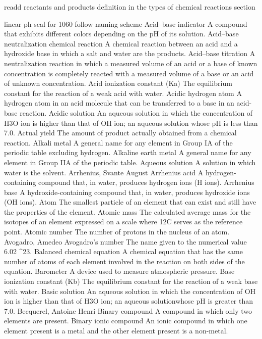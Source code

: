 \documentclass[10pt, roman]{article}
\begin{document}
readd reactants and products definition in the types of chemical reactions section


linear ph scal for 1060 
follow naming scheme
Acid–base indicator A compound that exhibits different colors depending on the pH of its solution.
Acid–base neutralization chemical reaction A chemical reaction between an acid and a hydroxide base in which a salt and water are the products.
Acid–base titration A neutralization reaction in which a measured volume of an acid or a base of known concentration is completely reacted with a measured volume of a base or an acid of unknown concentration.
Acid ionization constant (Ka) The equilibrium constant for the reaction of a weak acid with water.
Acidic hydrogen atom A hydrogen atom in an acid molecule that can be transferred to a base in an acid-base reaction.
Acidic solution An aqueous solution in which the concentration of H3O ion is higher than that of OH ion; an aqueous solution whose pH is less than 7.0.
Actual yield The amount of product actually obtained from a chemical reaction.
Alkali metal A general name for any element in Group IA of the periodic table excluding hydrogen.
Alkaline earth metal A general name for any element in Group IIA of the periodic table.
Aqueous solution A solution in which water is the solvent.
Arrhenius, Svante August
Arrhenius acid A hydrogen-containing compound that, in water, produces hydrogen ions (H ions).
Arrhenius base A hydroxide-containing compound that, in water, produces hydroxide ions (OH ions).
Atom The smallest particle of an element that can exist and still have the properties of the element.
Atomic mass The calculated average mass for the isotopes of an element expressed on a scale where 12C serves as the reference point.
Atomic number The number of protons in the nucleus of an atom.
Avogadro, Amedeo
Avogadro’s number The name given to the numerical value 6.02 ^23.
Balanced chemical equation A chemical equation that has the same number of atoms of each element involved in the reaction on both sides of the equation.
Barometer A device used to measure atmospheric pressure.
Base ionization constant (Kb) The equilibrium constant for the reaction of a weak base with water.
Basic solution An aqueous solution in which the concentration of OH ion is higher than that of H3O ion; an aqueous solutionwhose pH is greater than 7.0.
Becquerel, Antoine Henri
Binary compound A compound in which only two elements are present.
Binary ionic compound An ionic compound in which one element present is a metal and the other element present is a non-metal.
\end{document}
